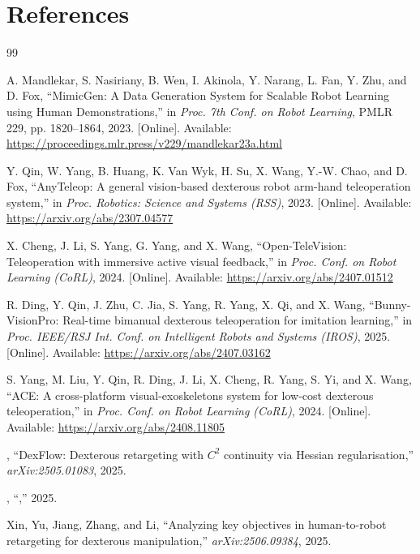 \chapter*{References}

\begin{thebibliography}{99}
\setlength{\itemsep}{2pt}

A. Mandlekar, S. Nasiriany, B. Wen, I. Akinola, Y. Narang, L. Fan, Y. Zhu,
and D. Fox, ``MimicGen: A Data Generation System for Scalable Robot Learning
using Human Demonstrations,'' in \emph{Proc. 7th Conf. on Robot Learning},
PMLR 229, pp. 1820--1864, 2023.
[Online]. Available: \url{https://proceedings.mlr.press/v229/mandlekar23a.html}

Y. Qin, W. Yang, B. Huang, K. Van Wyk, H. Su, X. Wang, Y.-W. Chao, and D. Fox,
``AnyTeleop: A general vision-based dexterous robot arm-hand teleoperation
system,'' in \emph{Proc. Robotics: Science and Systems (RSS)}, 2023.
[Online]. Available: \url{https://arxiv.org/abs/2307.04577}

X. Cheng, J. Li, S. Yang, G. Yang, and X. Wang, ``Open-TeleVision:
Teleoperation with immersive active visual feedback,'' in \emph{Proc. Conf. on
Robot Learning (CoRL)}, 2024. [Online]. Available:
\url{https://arxiv.org/abs/2407.01512}

R. Ding, Y. Qin, J. Zhu, C. Jia, S. Yang, R. Yang, X. Qi, and X. Wang,
``Bunny-VisionPro: Real-time bimanual dexterous teleoperation for imitation
learning,'' in \emph{Proc. IEEE/RSJ Int. Conf. on Intelligent Robots and
Systems (IROS)}, 2025. [Online]. Available:
\url{https://arxiv.org/abs/2407.03162}

S. Yang, M. Liu, Y. Qin, R. Ding, J. Li, X. Cheng, R. Yang, S. Yi, and X. Wang,
``ACE: A cross-platform visual-exoskeletons system for low-cost dexterous
teleoperation,'' in \emph{Proc. Conf. on Robot Learning (CoRL)}, 2024.
[Online]. Available: \url{https://arxiv.org/abs/2408.11805}

\ph{[Authors]}, ``DexFlow: Dexterous retargeting with $C^2$ continuity via
Hessian regularisation,'' \emph{arXiv:2505.01083}, 2025. 

\ph{[Authors]}, ``\ph{[Title]},'' 2025. 

\ph{[C.]} Xin, \ph{[Y.]} Yu, \ph{[X.]} Jiang, \ph{[Y.]} Zhang, and \ph{[H.]}
Li, ``Analyzing key objectives in human-to-robot retargeting for dexterous
manipulation,'' \emph{arXiv:2506.09384}, 2025.


\end{thebibliography}

